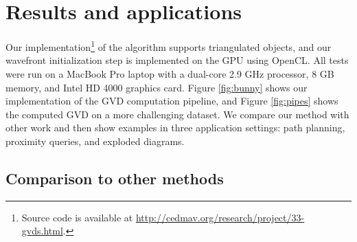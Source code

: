 \documentclass[submission]{gmp2017}
\begin{document}
\section{Results and applications}
Our implementation\footnote{Source code is available at \url{http://cedmav.org/research/project/33-gvds.html}.} of the algorithm supports  triangulated objects, and our wavefront initialization step is implemented on the GPU using OpenCL. All tests were run on a MacBook Pro laptop with a dual-core 2.9 GHz processor, 8 GB memory, and Intel HD 4000 graphics card. Figure \ref{fig:bunny} shows our implementation of the GVD computation pipeline, and Figure \ref{fig:pipes} shows the computed GVD on a more challenging dataset.  We compare our method with other work and then show examples in three application settings: path planning, proximity queries, and exploded diagrams.

\subsection{Comparison to other methods}



\end{document}
